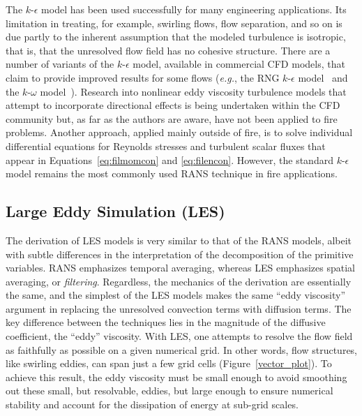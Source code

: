 \documentclass[graybox]{svmult}
\begin{document}
The $k$-$\epsilon$  model has been used successfully for many engineering applications. Its limitation in treating, for example, swirling flows, flow separation, and so on is due partly to the inherent assumption that the modeled turbulence is isotropic, that is, that the unresolved flow field has no cohesive structure. There are a number of variants of the $k$-$\epsilon$  model, available in commercial CFD models, that claim to provide improved results for some flows ({\em e.g.}, the RNG $k$-$\epsilon$  model~\cite{Yakhot} and the $k$-$\omega$ model~\cite{Wilcox}). Research into nonlinear eddy viscosity turbulence models that attempt to incorporate  directional  effects  is  being  undertaken within the CFD community but, as far as the authors are aware, have not been applied to fire problems. Another approach, applied mainly  outside  of fire, is to solve individual differential equations for Reynolds stresses and turbulent scalar fluxes that appear in Equations~\ref{eq:filmomcon} and \ref{eq:filencon}. However, the standard $k$-$\epsilon$ model remains the most commonly used RANS technique in fire applications.


\subsection{Large Eddy Simulation (LES)}

The derivation of LES models is very similar to that of the RANS models, albeit with subtle differences in the interpretation of the decomposition of the primitive variables. RANS emphasizes temporal averaging, whereas LES emphasizes spatial averaging, or {\em filtering}. Regardless, the mechanics of the derivation are essentially the same, and the simplest of the LES models makes the same ``eddy viscosity'' argument in replacing the unresolved convection terms with diffusion terms. The key difference between the techniques lies in the magnitude of the diffusive coefficient, the ``eddy'' viscosity. With LES, one attempts to resolve the flow field as faithfully as possible on a given numerical grid. In other words, flow structures, like swirling eddies, can span just a few grid cells (Figure~\ref{vector_plot}). To achieve this result, the eddy viscosity must be small enough to avoid smoothing out these small, but resolvable, eddies, but large enough to ensure numerical stability and account for the dissipation of energy at sub-grid scales.
\end{document}
